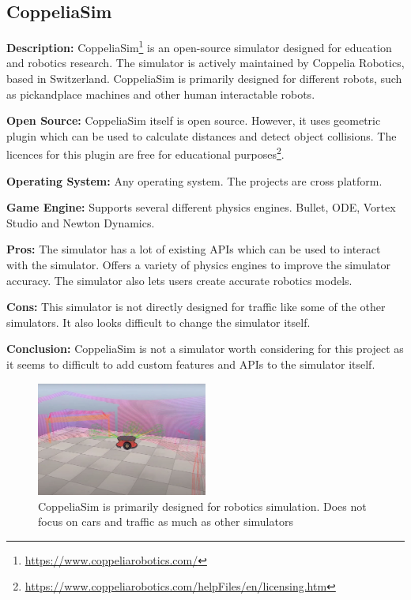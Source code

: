 \subsection{CoppeliaSim} \label{CoppeliaSim}
\textbf{Description:} CoppeliaSim\footnote{\url{https://www.coppeliarobotics.com/}} is an open-source simulator designed for education and robotics research. The simulator is actively maintained by Coppelia Robotics, based in Switzerland. CoppeliaSim is primarily designed for different robots, such as pick\-and\-place machines and other human interactable robots. 

\textbf{Open Source:} CoppeliaSim itself is open source. However, it uses geometric plugin which can be used to calculate distances and detect object collisions. The licences for this plugin are free for educational purposes\footnote{\url{https://www.coppeliarobotics.com/helpFiles/en/licensing.htm}}. 

\textbf{Operating System:} Any operating system. The projects are cross platform. 

\textbf{Game Engine:} Supports several different physics engines. Bullet, ODE, Vortex Studio and Newton Dynamics. 

\textbf{Pros:} The simulator has a lot of existing APIs which can be used to interact with the simulator. Offers a variety of physics engines to improve the simulator accuracy. The simulator also lets users create accurate robotics models. 

\textbf{Cons:} This simulator is not directly designed for traffic like some of the other simulators. It also looks difficult to change the simulator itself.

\textbf{Conclusion:} CoppeliaSim is not a simulator worth considering for this project as it seems to difficult to add custom features and APIs to the simulator itself. 


\begin{figure}[H]
    \centering
    \includegraphics[width=0.5\textwidth]{03_Background/Appendix/Simulators/CoppeliaSim.JPG}
    \caption[CoppeliaSim]{CoppeliaSim is primarily designed for robotics simulation. Does not focus on cars and traffic as much as other simulators}
\end{figure}



